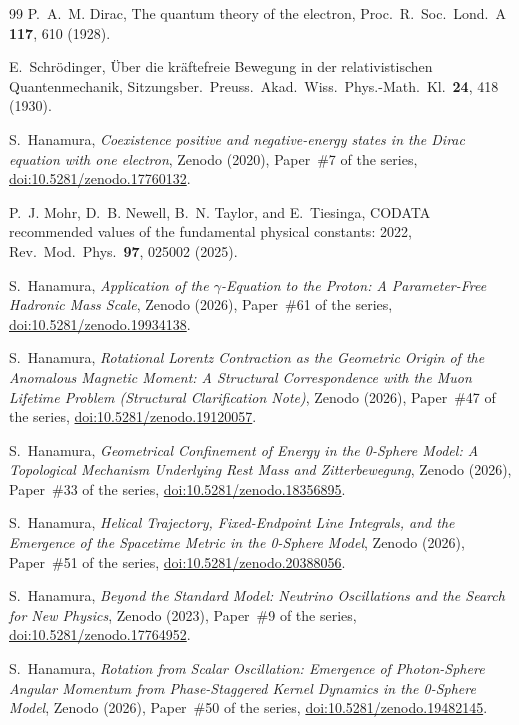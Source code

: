 \documentclass[%
 reprint, amsmath,amssymb, aps, prb, ]{revtex4-2}
\numberwithin{equation}{section}
\begin{document}
\begin{thebibliography}{99}
 P.~A.~M. Dirac, The quantum theory of the electron, Proc.\ R.\ Soc.\ Lond.\ A \textbf{117}, 610 (1928).

 E.~Schr\"odinger, \"Uber die kr\"aftefreie Bewegung in der relativistischen Quantenmechanik, Sitzungsber.\ Preuss.\ Akad.\ Wiss.\ Phys.-Math.\ Kl.\ \textbf{24}, 418 (1930).

 S.~Hanamura, \emph{Coexistence positive and negative-energy states in the Dirac equation with one electron}, Zenodo (2020), Paper~\#7 of the series, \href{https://doi.org/10.5281/zenodo.17760132}{doi:10.5281/zenodo.17760132}.

 P.~J. Mohr, D.~B. Newell, B.~N. Taylor, and E.~Tiesinga, CODATA recommended values of the fundamental physical constants: 2022, Rev.\ Mod.\ Phys.\ \textbf{97}, 025002 (2025).

 S.~Hanamura, \emph{Application of the $\gamma$-Equation to the Proton: A Parameter-Free Hadronic Mass Scale}, Zenodo (2026), Paper~\#61 of the series, \href{https://doi.org/10.5281/zenodo.19934138}{doi:10.5281/zenodo.19934138}.

 S.~Hanamura, \emph{Rotational Lorentz Contraction as the Geometric Origin of the Anomalous Magnetic Moment: A Structural Correspondence with the Muon Lifetime Problem (Structural Clarification Note)}, Zenodo (2026), Paper~\#47 of the series, \href{https://doi.org/10.5281/zenodo.19120057}{doi:10.5281/zenodo.19120057}.

 S.~Hanamura, \emph{Geometrical Confinement of Energy in the 0-Sphere Model: A Topological Mechanism Underlying Rest Mass and Zitterbewegung}, Zenodo (2026), Paper~\#33 of the series, \href{https://doi.org/10.5281/zenodo.18356895}{doi:10.5281/zenodo.18356895}.

 S.~Hanamura, \emph{Helical Trajectory, Fixed-Endpoint Line Integrals, and the Emergence of the Spacetime Metric in the 0-Sphere Model}, Zenodo (2026), Paper~\#51 of the series, \href{https://doi.org/10.5281/zenodo.20388056}{doi:10.5281/zenodo.20388056}.

 S.~Hanamura, \emph{Beyond the Standard Model: Neutrino Oscillations and the Search for New Physics}, Zenodo (2023), Paper~\#9 of the series, \href{https://doi.org/10.5281/zenodo.17764952}{doi:10.5281/zenodo.17764952}.

 S.~Hanamura, \emph{Rotation from Scalar Oscillation: Emergence of Photon-Sphere Angular Momentum from Phase-Staggered Kernel Dynamics in the 0-Sphere Model}, Zenodo (2026), Paper~\#50 of the series, \href{https://doi.org/10.5281/zenodo.19482145}{doi:10.5281/zenodo.19482145}.


\end{thebibliography}
\end{document}
